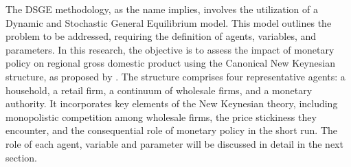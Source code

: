 \documentclass[../thesis.tex]{subfiles}
\begin{document}

The DSGE methodology, as the name implies, involves the utilization of a Dynamic and Stochastic General Equilibrium model. This model outlines the problem to be addressed, requiring the definition of agents, variables, and parameters. In this research, the objective is to assess the impact of monetary policy on regional gross domestic product using the Canonical New Keynesian structure, as proposed by \textcite{solis-garcia_ucb_2022}. The structure comprises four representative agents: a household, a retail firm, a continuum of wholesale firms, and a monetary authority. It incorporates key elements of the New Keynesian theory, including monopolistic competition among wholesale firms, the price stickiness they encounter, and the consequential role of monetary policy in the short run. The role of each agent, variable and parameter will be discussed in detail in the next section.
\end{document}
